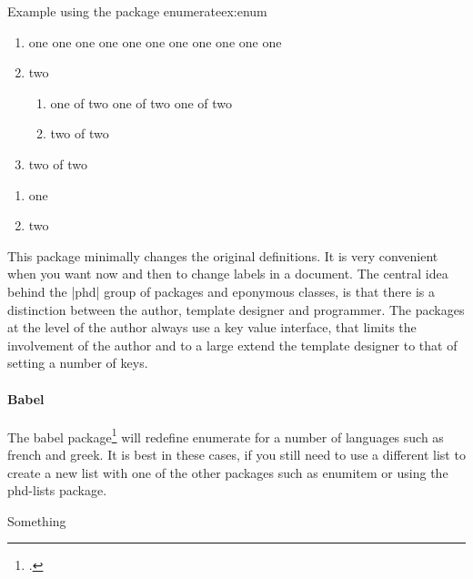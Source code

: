 \begin{texcode}{Example using the package enumerate}{ex:enum}
 \begin{enumerate}[EX i.]
   \item one one one one one one one
         one one one one\label{LA}
   \item two
      \begin{enumerate}[{example} a)]
        \item one of two one of two
          one of two\label{LB}
        \item two of two
       \end{enumerate}
   \item two of two
 \end{enumerate}
 

 \begin{enumerate}[{A}-1]
 \item one\label{LC}
 \item two
 \end{enumerate}
\end{texcode}

 This package minimally changes the original \latexe definitions. It is very convenient when you
 want now and then to change labels in a document. The central idea behind the |phd| group of
 packages and eponymous classes, is that there is a distinction between the author, template designer and 
 programmer. The packages at the level of the author always use a key value interface, that
 limits the involvement of the author and to a large extend the template designer to that of 
 setting a number of keys. 

\paragraph{Babel} The babel package\footcite{babel} will redefine enumerate for a number of languages such as french and greek. It is best in these cases, if you still need to use a different list to create a new list with one of the other packages such as enumitem or using the phd-lists package.
\bgroup
{}
\extrasfrench

\lorem
\begin{frenchenumerate}
\item \lorem
      \lorem
        \begin{frenchenumerate}
         \item Something
         \item \lorem
               
               \lorem
        \end{frenchenumerate}
\item \lorem
\end{frenchenumerate}


